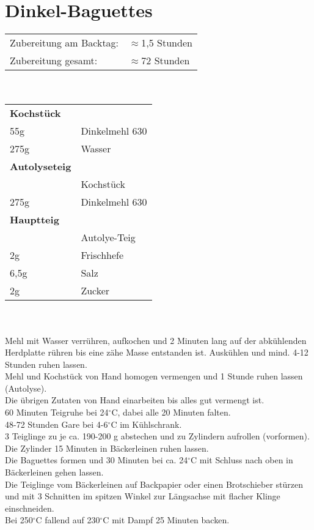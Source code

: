\section{Dinkel-Baguettes}
\begin{tabular}{ll}
    Zubereitung am Backtag: & $\approx$1,5 Stunden \\
    Zubereitung gesamt:     & $\approx$72 Stunden
\end{tabular}\\\paragraph*{}
\begin{tabular}{ll}
    \textbf{Kochstück} \\
    55g  & Dinkelmehl 630 \\
    275g & Wasser         \\
    \textbf{Autolyseteig} \\
    & Kochstück      \\
    275g & Dinkelmehl 630 \\
    \textbf{Hauptteig} \\
    & Autolye-Teig   \\
    2g   & Frischhefe     \\
    6,5g & Salz           \\
    2g   & Zucker         \\
\end{tabular}\\\paragraph*{}
Mehl mit Wasser verrühren, aufkochen und 2 Minuten lang auf der abkühlenden Herdplatte rühren bis eine zähe Masse entstanden ist. Auskühlen und mind. 4-12 Stunden ruhen lassen.\\
Mehl und Kochstück von Hand homogen vermengen und 1 Stunde ruhen lassen (Autolyse).\\
Die übrigen Zutaten von Hand einarbeiten bis alles gut vermengt ist.\\
60 Minuten Teigruhe bei 24$^\circ$C, dabei alle 20 Minuten falten.\\
48-72 Stunden Gare bei 4-6$^\circ$C im Kühlschrank.\\
3 Teiglinge zu je ca. 190-200 g abstechen und zu Zylindern aufrollen (vorformen).\\
Die Zylinder 15 Minuten in Bäckerleinen ruhen lassen.\\
Die Baguettes formen und 30 Minuten bei ca. 24$^\circ$C mit Schluss nach oben in Bäckerleinen gehen lassen.\\
Die Teiglinge vom Bäckerleinen auf Backpapier oder einen Brotschieber stürzen und mit 3 Schnitten im spitzen Winkel zur Längsachse mit flacher Klinge einschneiden.\\
Bei 250$^\circ$C fallend auf 230$^\circ$C mit Dampf 25 Minuten backen.\\
\newpage


